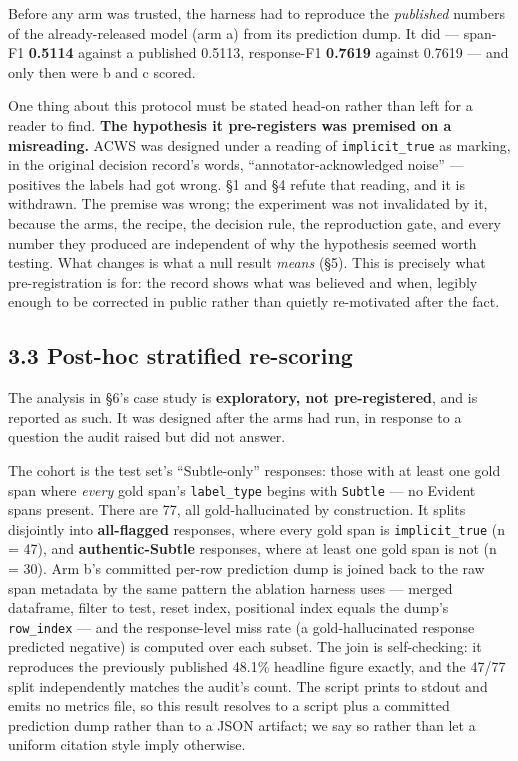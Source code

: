 \documentclass[11pt]{article}
\begin{document}
Before any arm was trusted, the harness had to reproduce the \emph{published} numbers of the
already-released model (arm a) from its prediction dump. It did --- span-F1 \textbf{0.5114} against
a published 0.5113, response-F1 \textbf{0.7619} against 0.7619 --- and only then were b and c
scored.

One thing about this protocol must be stated head-on rather than left for a reader to find.
\textbf{The hypothesis it pre-registers was premised on a misreading.} ACWS was designed under a
reading of \texttt{implicit\_true} as marking, in the original decision record's words,
``annotator-acknowledged noise'' --- positives the labels had got wrong. §1 and §4 refute that
reading, and it is withdrawn. The premise was wrong; the experiment was not invalidated by
it, because the arms, the recipe, the decision rule, the reproduction gate, and every number
they produced are independent of why the hypothesis seemed worth testing. What changes is
what a null result \emph{means} (§5). This is precisely what pre-registration is for: the record
shows what was believed and when, legibly enough to be corrected in public rather than
quietly re-motivated after the fact.

\subsection{3.3 Post-hoc stratified re-scoring}\label{post-hoc-stratified-re-scoring}

The analysis in §6's case study is \textbf{exploratory, not pre-registered}, and is reported as
such. It was designed after the arms had run, in response to a question the audit raised
but did not answer.

The cohort is the test set's ``Subtle-only'' responses: those with at least one gold span
where \emph{every} gold span's \texttt{label\_type} begins with \texttt{Subtle} --- no Evident spans present.
There are 77, all gold-hallucinated by construction. It splits disjointly into
\textbf{all-flagged} responses, where every gold span is \texttt{implicit\_true} (n = 47), and
\textbf{authentic-Subtle} responses, where at least one gold span is not (n = 30). Arm b's
committed per-row prediction dump is joined back to the raw span metadata by the same
pattern the ablation harness uses --- merged dataframe, filter to test, reset index,
positional index equals the dump's \texttt{row\_index} --- and the response-level miss rate (a
gold-hallucinated response predicted negative) is computed over each subset. The join is
self-checking: it reproduces the previously published 48.1\% headline figure exactly, and the
47/77 split independently matches the audit's count. The script prints to stdout and emits
no metrics file, so this result resolves to a script plus a committed prediction dump rather
than to a JSON artifact; we say so rather than let a uniform citation style imply otherwise.
\end{document}
